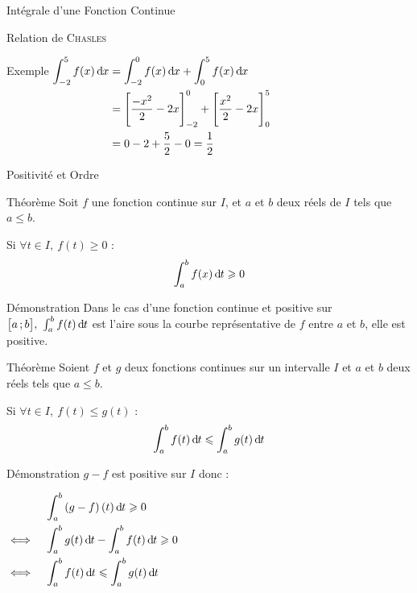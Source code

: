 \documentclass{coursbook}
\begin{document}
\begin{Gpartie}{Intégrale d'une Fonction Continue}
\begin{Spartie}{Relation de \textsc{Chasles}}
\begin{SSpartie}{Exemple}
                $\begin{aligned}[t]
                    \int_{-2}^5f(x)\dx &= \int_{-2}^0f(x)\dx+\int_0^5f(x)\dx \\
                    &= \Bigg[\frac{-x^2}{2}-2x\Bigg]_{-2}^0+\Bigg[\frac{x^2}{2}-2x\Bigg]_0^5 \\
                    &= 0-2+\frac{5}{2}-0=\frac{1}{2} 
                \end{aligned}$
            \end{SSpartie}
        \end{Spartie}
        \begin{Spartie}{Positivité et Ordre} 
            \begin{SSpartie}{Théorème} 
                Soit $f$ une fonction continue sur $I$, et $a$ et $b$ deux réels de $I$ tels que $a\leq b$.

                Si $\forall t\in I,~f(t)\geq0$ : \[\int_a^b f(x)\,\mathrm{d}\hspace*{-0.05em}t\geqslant0\]
                \begin{SSSpartie}{Démonstration} 
                    Dans le cas d'une fonction continue et positive sur $\big[a\,; b\big],~\int_a^b f(t)\,\mathrm{d}\hspace*{-0.05em}t$ est l'aire sous la courbe représentative de $f$ entre $a$ et $b$, elle est positive.
                \end{SSSpartie}
            \end{SSpartie}
            \begin{SSpartie}{Théorème} 
                Soient $f$ et $g$ deux fonctions continues sur un intervalle $I$ et $a$ et $b$ deux réels tels que $a\leq b$.

                Si $\forall t\in I,~f(t)\leq g(t)$ : \[\int_a^b f(t)\,\mathrm{d}\hspace*{-0.05em}t\leqslant\int_a^bg(t)\,\mathrm{d}\hspace*{-0.05em}t\]
                \begin{SSSpartie}{Démonstration} 
                    $g-f$ est positive sur $I$ donc : 

                    $\begin{aligned}[t]
                        &\quad\int_a^b\left(g-f\right)(t)\,\mathrm{d}\hspace*{-0.05em}t\geqslant 0 \\
                        \iff&\quad\int_a^b g(t)\,\mathrm{d}\hspace*{-0.05em}t-\int_a^b f(t)\,\mathrm{d}\hspace*{-0.05em}t\geqslant 0 \\
                        \iff&\quad\int_a^b f(t)\,\mathrm{d}\hspace*{-0.05em}t\leqslant\int_a^b g(t)\,\mathrm{d}\hspace*{-0.05em}t
                    \end{aligned}$
                \end{SSSpartie}
            \end{SSpartie}
        \end{Spartie}
    \end{Gpartie}
\end{document}
